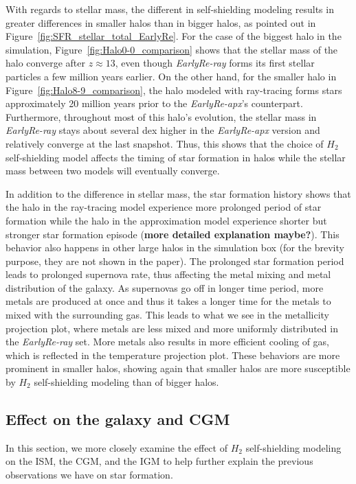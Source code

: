 \documentclass[linenumbers, twocolumn]{aastex631}
\begin{document}
With regards to stellar mass, the different in self-shielding modeling results in greater differences in smaller halos than in bigger halos, as pointed out in Figure~\ref{fig:SFR_stellar_total_EarlyRe}. For the case of the biggest halo in the simulation, Figure~\ref{fig:Halo0-0_comparison} shows that the stellar mass of the halo converge after $z \approx 13$, even though \textit{EarlyRe-ray} forms its first stellar particles a few million years earlier. On the other hand, for the smaller halo in Figure~\ref{fig:Halo8-9_comparison}, the halo modeled with ray-tracing forms stars approximately 20 million years prior to the \textit{EarlyRe-apx}'s counterpart. Furthermore, throughout most of this halo's evolution, the stellar mass in \textit{EarlyRe-ray} stays about several dex higher in the \textit{EarlyRe-apx} version and relatively converge at the last snapshot. Thus, this shows that the choice of $H_{2}$ self-shielding model affects the timing of star formation in halos while the stellar mass between two models will eventually converge.  

In addition to the difference in stellar mass, the star formation history shows that the halo in the ray-tracing model experience more prolonged period of star formation while the halo in the approximation model experience shorter but stronger star formation episode (\textbf{more detailed explanation maybe?}). This behavior also happens in other large halos in the simulation box (for the brevity purpose, they are not shown in the paper). The prolonged star formation period leads to prolonged supernova rate, thus affecting the metal mixing and metal distribution of the galaxy. As supernovas go off in longer time period, more metals are produced at once and thus it takes a longer time for the metals to mixed with the surrounding gas. This leads to what we see in the metallicity projection plot, where metals are less mixed and more uniformly distributed in the \textit{EarlyRe-ray} set. More metals also results in more efficient cooling of gas, which is reflected in the temperature projection plot. These behaviors are more prominent in smaller halos, showing again that smaller halos are more susceptible by $H_{2}$ self-shielding modeling than of bigger halos. 

\subsection{Effect on the galaxy and CGM}
\label{subsect:ISM_CGM}

In this section, we more closely examine the effect of $H_{2}$ self-shielding modeling on the ISM, the CGM, and the IGM to help further explain the previous observations we have on star formation.
\end{document}

